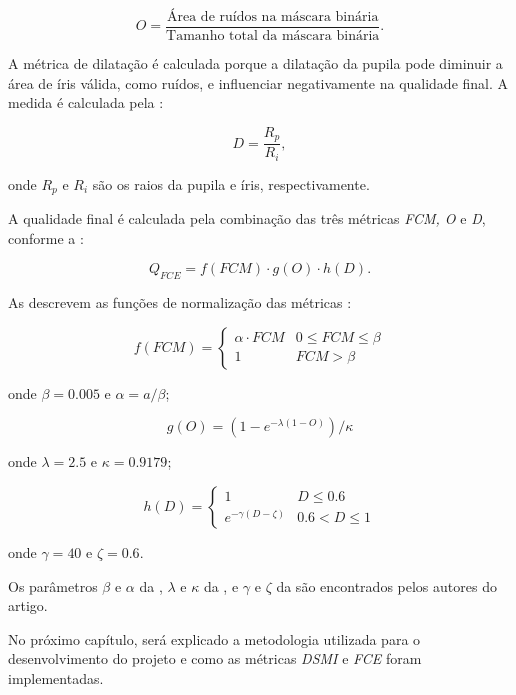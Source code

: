 \begin{equation}\label{eq:fce:O}
    O = \frac{\text{Área de ruídos na máscara binária}}{\text{Tamanho total da máscara binária}}.
\end{equation}

\par A métrica de dilatação é calculada porque a dilatação da pupila pode diminuir a área de íris válida, como ruídos, e influenciar negativamente na qualidade final.
A medida é calculada pela  \cite{du2010}:

\begin{equation}\label{eq:fce:D}
    D = \frac{R_{p}}{R_{i}},
\end{equation}

\noindent onde $R_{p}$ e $R_{i}$ são os raios da pupila e íris, respectivamente.

\par A qualidade final é calculada pela combinação das três métricas \textit{FCM, O} e \textit{D}, conforme a  \cite{du2010}:

\begin{equation} \label{eq:fce:Q}
    Q_{FCE} = f(FCM) \cdot g(O) \cdot h(D).
\end{equation}

As  descrevem as funções de normalização das métricas \cite{du2010}:

\begin{equation}\label{eq:fce:normFCM}
  f(FCM) =
  \begin{cases}
    \alpha \cdot FCM & 0 \leq FCM \leq \beta\\
    1  &  FCM > \beta
  \end{cases}
\end{equation}

\noindent onde $\beta = 0.005$ e $\alpha = a/\beta$;


\begin{equation}\label{eq:fce:normO}
  g(O) = (1 - e^{-\lambda(1 - O)})/\kappa
\end{equation}

\noindent onde $\lambda = 2.5$ e $\kappa = 0.9179$;

\begin{equation}\label{eq:fce:normD}
  h(D) =
  \begin{cases}
    1 & D \leq 0.6\\
    e^{-\gamma(D - \zeta)}  &  0.6 < D \leq 1
  \end{cases}
\end{equation}

\noindent onde $\gamma = 40$ e $\zeta = 0.6$.

\par Os parâmetros $\beta$ e $\alpha$ da , $\lambda$ e $\kappa$ da , e $\gamma$ e $\zeta$ da  são encontrados pelos autores do artigo.

\par No próximo capítulo, será explicado a metodologia utilizada para o desenvolvimento do projeto e como as métricas \textit{\acrshort{DSMI}} e \textit{\acrshort{FCE}} foram implementadas.